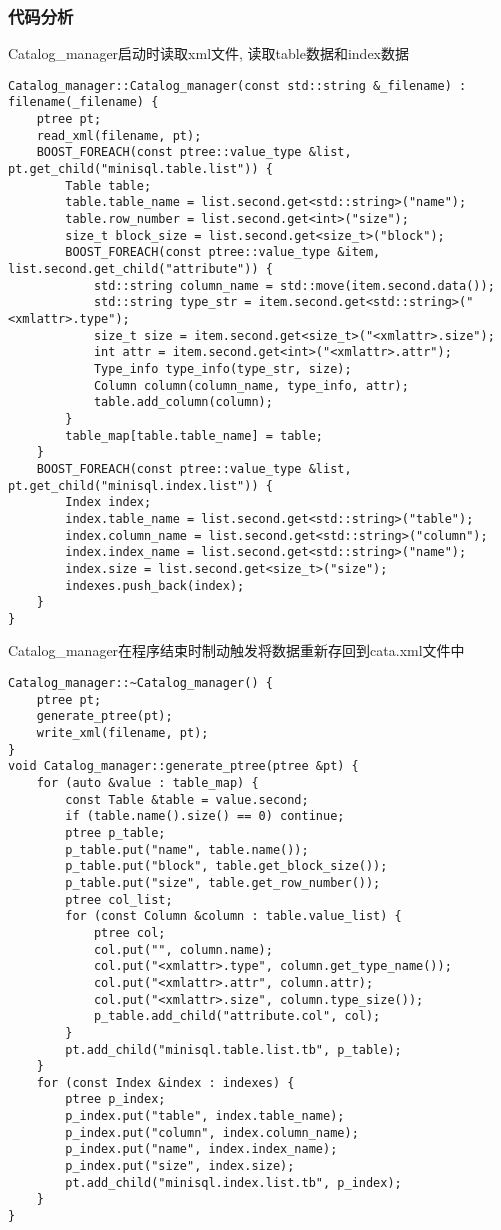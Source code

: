 \documentclass[10pt]{article}
\begin{document}
\begin{CJK}{UTF8}{gkai}
	 \subsubsection{代码分析}
	 Catalog\_manager启动时读取xml文件, 读取table数据和index数据
\begin{lstlisting}
Catalog_manager::Catalog_manager(const std::string &_filename) : filename(_filename) {
    ptree pt;
    read_xml(filename, pt);
    BOOST_FOREACH(const ptree::value_type &list, pt.get_child("minisql.table.list")) {
        Table table;
        table.table_name = list.second.get<std::string>("name");
        table.row_number = list.second.get<int>("size");
        size_t block_size = list.second.get<size_t>("block");
        BOOST_FOREACH(const ptree::value_type &item, list.second.get_child("attribute")) {
            std::string column_name = std::move(item.second.data());
            std::string type_str = item.second.get<std::string>("<xmlattr>.type");
            size_t size = item.second.get<size_t>("<xmlattr>.size");
            int attr = item.second.get<int>("<xmlattr>.attr");
            Type_info type_info(type_str, size);
            Column column(column_name, type_info, attr);
            table.add_column(column);
        }
        table_map[table.table_name] = table;
    }
    BOOST_FOREACH(const ptree::value_type &list, pt.get_child("minisql.index.list")) {
        Index index;
        index.table_name = list.second.get<std::string>("table");
        index.column_name = list.second.get<std::string>("column");
        index.index_name = list.second.get<std::string>("name");
        index.size = list.second.get<size_t>("size");
        indexes.push_back(index);
    }
}
\end{lstlisting}
	Catalog\_manager在程序结束时制动触发将数据重新存回到cata.xml文件中
\begin{lstlisting}
Catalog_manager::~Catalog_manager() {
    ptree pt;
    generate_ptree(pt);
    write_xml(filename, pt);
}
void Catalog_manager::generate_ptree(ptree &pt) {
    for (auto &value : table_map) {
        const Table &table = value.second;
        if (table.name().size() == 0) continue;
        ptree p_table;
        p_table.put("name", table.name());
        p_table.put("block", table.get_block_size());
        p_table.put("size", table.get_row_number());
        ptree col_list;
        for (const Column &column : table.value_list) {
            ptree col;
            col.put("", column.name);
            col.put("<xmlattr>.type", column.get_type_name());
            col.put("<xmlattr>.attr", column.attr);
            col.put("<xmlattr>.size", column.type_size());
            p_table.add_child("attribute.col", col);
        }
        pt.add_child("minisql.table.list.tb", p_table);
    }
    for (const Index &index : indexes) {
        ptree p_index;
        p_index.put("table", index.table_name);
        p_index.put("column", index.column_name);
        p_index.put("name", index.index_name);
        p_index.put("size", index.size);
        pt.add_child("minisql.index.list.tb", p_index);
    }
}
\end{lstlisting}

\end{CJK}
\end{document}
